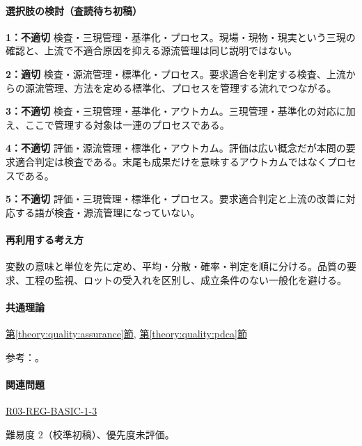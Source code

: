 \paragraph{選択肢の検討（査読待ち初稿）}\mbox{}\par

\noindent\textbf{1：不適切} 検査・三現管理・基準化・プロセス。現場・現物・現実という三現の確認と、上流で不適合原因を抑える源流管理は同じ説明ではない。\par

\noindent\textbf{2：適切} 検査・源流管理・標準化・プロセス。要求適合を判定する検査、上流からの源流管理、方法を定める標準化、プロセスを管理する流れでつながる。\par

\noindent\textbf{3：不適切} 検査・三現管理・基準化・アウトカム。三現管理・基準化の対応に加え、ここで管理する対象は一連のプロセスである。\par

\noindent\textbf{4：不適切} 評価・源流管理・標準化・アウトカム。評価は広い概念だが本問の要求適合判定は検査である。末尾も成果だけを意味するアウトカムではなくプロセスである。\par

\noindent\textbf{5：不適切} 評価・三現管理・標準化・プロセス。要求適合判定と上流の改善に対応する語が検査・源流管理になっていない。\par

\paragraph{再利用する考え方} 変数の意味と単位を先に定め、平均・分散・確率・判定を順に分ける。品質の要求、工程の監視、ロットの受入れを区別し、成立条件のない一般化を避ける。

\paragraph{共通理論} \hyperref[theory:quality:assurance]{第\ref*{theory:quality:assurance}節}, \hyperref[theory:quality:pdca]{第\ref*{theory:quality:pdca}節}

\par 参考：\cite{quality_process_jsqc,quality_iso_process}。

\paragraph{関連問題} \hyperref[q:r03-reg-basic-1-3]{R03-REG-BASIC-1-3}

\par 難易度 2（校準初稿）、優先度未評価。
